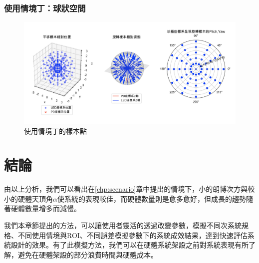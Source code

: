 \subsubsection{使用情境丁：球狀空間}
\begin{figure}[htpb]
    \centering
    \includegraphics[width=15cm]{ch4pic/d_scenario.png}
    \caption{使用情境丁的樣本點}
    \label{pic:d_scenario}
\end{figure}





\section{結論}
\label{chp:4_conclusion}
由以上分析，我們可以看出在\ref{chp:scenario}章中提出的情境下，小的朗博次方與較小的硬體天頂角$\alpha$使系統的表現較佳，而硬體數量則是愈多愈好，但成長的趨勢隨著硬體數量增多而減慢。

我們本章節提出的方法，可以讓使用者靈活的透過改變參數，模擬不同次系統規格、不同使用情境與ROI、不同誤差模擬參數下的系統成效結果，達到快速評估系統設計的效果。有了此模擬方法，我們可以在硬體系統架設之前對系統表現有所了解，避免在硬體架設的部分浪費時間與硬體成本。




































